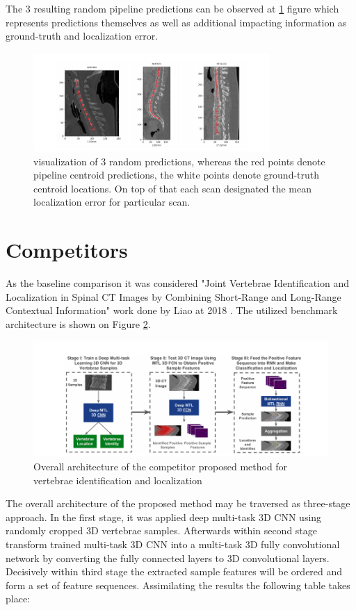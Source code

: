 The 3 resulting random pipeline predictions can be observed at \ref{fig:predictions} figure which represents predictions themselves as well as additional impacting information as ground-truth and localization error. 
\begin{figure}[h]
    \centering \includegraphics[width=9cm]{images/predictions.png}
    \caption {visualization of 3 random predictions, whereas the red points denote pipeline centroid predictions, the white points denote ground-truth centroid locations. On top of that each scan designated the mean localization error for particular scan.}
    \label{fig:predictions}
\end{figure}

\newpage
\section{Competitors}
As the baseline comparison it was considered "Joint Vertebrae Identification and Localization in Spinal CT Images by Combining Short-Range and Long-Range Contextual Information" work done by Liao at 2018 \cite{Liao2018}. The utilized benchmark architecture is shown on Figure \ref{fig:competitor}.

\begin{figure}[h]
    \centering \includegraphics[width=12cm]{images/competitor.png}
    \caption {Overall architecture of the competitor proposed method for vertebrae identification and localization}
    \label{fig:competitor}
\end{figure}

The overall architecture of the proposed method may be traversed as three-stage approach. In the first stage, it was applied deep multi-task 3D CNN using randomly cropped 3D vertebrae samples. Afterwards within second stage transform trained multi-task 3D CNN into a multi-task 3D fully convolutional network by converting the fully connected layers to 3D convolutional layers. Decisively within third stage the extracted sample features will be ordered and form a set of feature sequences. Assimilating the results the following table takes place:


